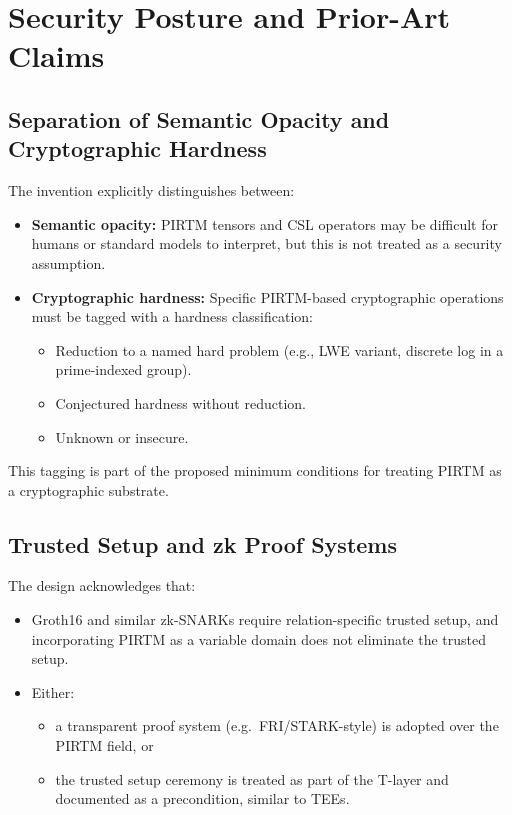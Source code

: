 \documentclass[11pt]{article}
\begin{document}
\section{Security Posture and Prior-Art Claims}

\subsection{Separation of Semantic Opacity and Cryptographic Hardness}

The invention explicitly distinguishes between:

\begin{itemize}[leftmargin=*]
  \item \textbf{Semantic opacity:} PIRTM tensors and CSL operators may be difficult for humans or standard models to interpret, but this is not treated as a security assumption.
  \item \textbf{Cryptographic hardness:} Specific PIRTM-based cryptographic operations must be tagged with a hardness classification:
    \begin{itemize}
      \item Reduction to a named hard problem (e.g., LWE variant, discrete log in a prime-indexed group).
      \item Conjectured hardness without reduction.
      \item Unknown or insecure.
    \end{itemize}
\end{itemize}

This tagging is part of the proposed minimum conditions for treating PIRTM as a cryptographic substrate.

\subsection{Trusted Setup and zk Proof Systems}

The design acknowledges that:

\begin{itemize}[leftmargin=*]
  \item Groth16 and similar zk-SNARKs require relation-specific trusted setup, and incorporating PIRTM as a variable domain does not eliminate the trusted setup.
  \item Either:
    \begin{itemize}
      \item a transparent proof system (e.g.~FRI/STARK-style) is adopted over the PIRTM field, or
      \item the trusted setup ceremony is treated as part of the T-layer and documented as a precondition, similar to TEEs.
    \end{itemize}
\end{itemize}
\end{document}
